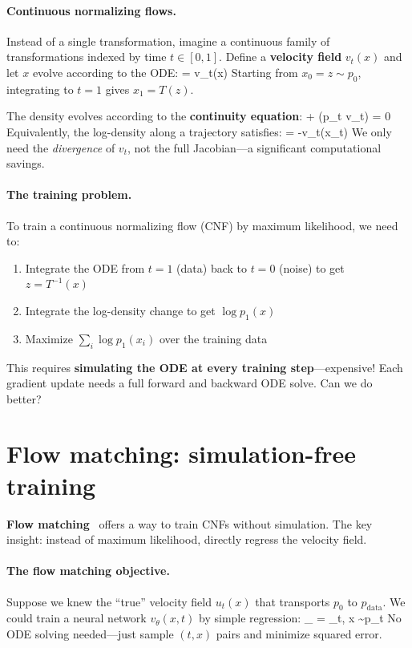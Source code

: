 \documentclass[11pt]{article}
\begin{document}
\paragraph{Continuous normalizing flows.} Instead of a single transformation, imagine a continuous family of transformations indexed by time $t \in [0, 1]$. Define a \textbf{velocity field} $v_t(x)$ and let $x$ evolve according to the ODE:
\beq
{} = v_t(x)
\eeq
Starting from $x_0 = z \sim p_0$, integrating to $t = 1$ gives $x_1 = T(z)$.

The density evolves according to the \textbf{continuity equation}:
\beq
{} + \nabla \cdot (p_t v_t) = 0
\eeq
Equivalently, the log-density along a trajectory satisfies:
\beq
{} = -\nabla \cdot v_t(x_t)
\eeq
We only need the \emph{divergence} of $v_t$, not the full Jacobian---a significant computational savings.

\paragraph{The training problem.} To train a continuous normalizing flow (CNF) by maximum likelihood, we need to:
\begin{enumerate}
\item Integrate the ODE from $t=1$ (data) back to $t=0$ (noise) to get $z = T^{-1}(x)$
\item Integrate the log-density change to get $\log p_1(x)$
\item Maximize $\sum_i \log p_1(x_i)$ over the training data
\end{enumerate}

This requires \textbf{simulating the ODE at every training step}---expensive! Each gradient update needs a full forward and backward ODE solve. Can we do better?

\section{Flow matching: simulation-free training}

\textbf{Flow matching}~\cite{lipman2022flow} offers a way to train CNFs without simulation. The key insight: instead of maximum likelihood, directly regress the velocity field.

\paragraph{The flow matching objective.} Suppose we knew the ``true'' velocity field $u_t(x)$ that transports $p_0$ to $p_{\text{data}}$. We could train a neural network $v_\theta(x, t)$ by simple regression:
\beq
{}_{} = \E_{t, x \sim p_t}
\eeq
No ODE solving needed---just sample $(t, x)$ pairs and minimize squared error.
\end{document}
